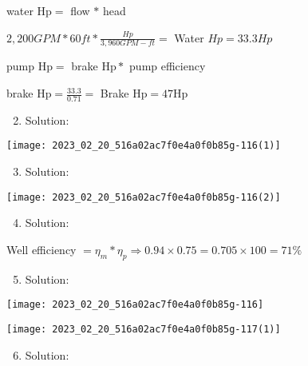 \documentclass[10pt]{article}
\begin{document}
\begin{enumerate}
\begin{enumerate}
water $\mathrm{Hp}=$ flow $*$ head

$2,200 G P M * 60 f t * \frac{H p}{3,960 G P M-f t}=$ Water $H p=33.3 H p$

pump $\mathrm{Hp}=$ brake $\mathrm{Hp} *$ pump efficiency

brake $\mathrm{Hp}=\frac{33.3}{0.71}=$ Brake $\mathrm{Hp}=47 \mathrm{Hp}$

\begin{enumerate}
  \setcounter{enumi}{1}
  \item Solution:
\end{enumerate}

\begin{center}
\texttt{[image: 2023\_02\_20\_516a02ac7f0e4a0f0b85g-116(1)]}
\end{center}

\begin{enumerate}
  \setcounter{enumi}{2}
  \item Solution:
\end{enumerate}

\begin{center}
\texttt{[image: 2023\_02\_20\_516a02ac7f0e4a0f0b85g-116(2)]}
\end{center}

\begin{enumerate}
  \setcounter{enumi}{3}
  \item Solution:
\end{enumerate}

Well efficiency $=\eta_{m} * \eta_{p} \Longrightarrow 0.94 \times 0.75=0.705 \times 100=71 \%$

\begin{enumerate}
  \setcounter{enumi}{4}
  \item Solution:
\end{enumerate}

\begin{center}
\texttt{[image: 2023\_02\_20\_516a02ac7f0e4a0f0b85g-116]}
\end{center}

\begin{center}
\texttt{[image: 2023\_02\_20\_516a02ac7f0e4a0f0b85g-117(1)]}
\end{center}

\begin{enumerate}
  \setcounter{enumi}{5}
  \item Solution:
\end{enumerate}


\end{enumerate}
\end{enumerate}
\end{document}
